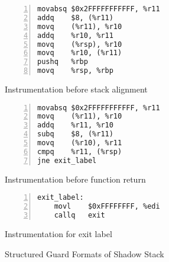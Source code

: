 \begin{figure}[hbp]

\begin{center}
    
\begin{minipage}{0.3\textwidth}
\begin{center}
\begin{lstlisting}[basicstyle=\scriptsize,numbers=left]
movabsq	$0x2FFFFFFFFFFF, %r11
addq	$8, (%r11)
movq	(%r11), %r10
addq	%r10, %r11
movq	(%rsp), %r10
movq	%r10, (%r11)
pushq	%rbp
movq	%rsp, %rbp
\end{lstlisting}
\small{Instrumentation before stack alignment}
\end{center}
\end{minipage}

\hfill

\begin{minipage}{0.3\textwidth}
\begin{center}
\begin{lstlisting}[basicstyle=\scriptsize,numbers=left]
movabsq	$0x2FFFFFFFFFFF, %r11
movq	(%r11), %r10
addq	%r11, %r10
subq	$8, (%r11)
movq	(%r10), %r11
cmpq	%r11, (%rsp)
jne	exit_label
\end{lstlisting}
\small{Instrumentation before function return}
\end{center}
\end{minipage}

\hfill

\begin{minipage}{0.3\textwidth}
\begin{center}
\begin{lstlisting}[basicstyle=\scriptsize,numbers=left]
exit_label:
    movl    $0xFFFFFFFF, %edi
    callq   exit
\end{lstlisting}
\small{Instrumentation for exit label}
\end{center}
\end{minipage}

\caption{Structured Guard Formats of Shadow Stack}\label{fg-shadowstack}

\end{center}
\end{figure}